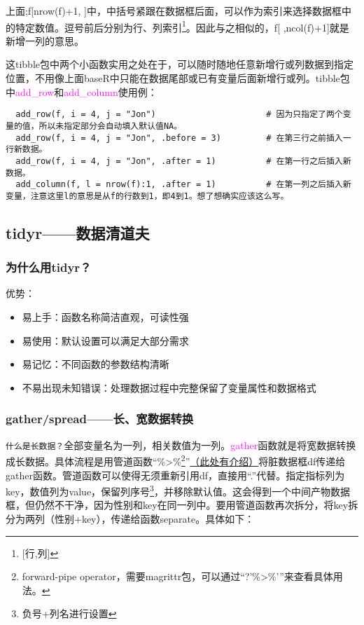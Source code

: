 \documentclass[cn,hazy,blue,14pt,screen]{elegantnote}
\begin{document}
上面;f[nrow(f)+1, ]中，中括号紧跟在数据框后面，可以作为索引来选择数据框中的特定数值。逗号前后分别为行、列索引\footnote{[行,列]}。因此与之相似的，f[ ,ncol(f)+1]就是新增一列的意思。

这tibble包中两个小函数实用之处在于，可以随时随地任意新增行或列数据到指定位置，不用像上面baseR中只能在数据尾部或已有变量后面新增行或列。tibble包中\textcolor{magenta}{add\_row}和\textcolor{magenta}{add\_column}使用例：

\begin{lstlisting}
  add_row(f, i = 4, j = "Jon")                      # 因为只指定了两个变量的值，所以未指定部分会自动填入默认值NA。
  add_row(f, i = 4, j = "Jon", .before = 3)         # 在第三行之前插入一行新数据。
  add_row(f, i = 4, j = "Jon", .after = 1)          # 在第一行之后插入新数据。
  add_column(f, l = nrow(f):1, .after = 1)          # 在第一列之后插入新变量，注意这里l的意思是从f的行数到1，即4到1。想了想确实应该这么写。
\end{lstlisting}

\subsection{tidyr——数据清道夫}

\subsubsection{为什么用tidyr？}

优势：

\begin{itemize}
  \item 易上手：函数名称简洁直观，可读性强
  \item 易使用：默认设置可以满足大部分需求
  \item 易记忆：不同函数的参数结构清晰
  \item 不易出现未知错误：处理数据过程中完整保留了变量属性和数据格式
\end{itemize}

\subsubsection{gather/spread——长、宽数据转换}

\lstinline{什么是长数据？}全部变量名为一列，相关数值为一列。\textcolor{magenta}{gather}函数就是将宽数据转换成长数据。具体流程是用管道函数“\%>\%\footnote{forward-pipe operator，需要magrittr包，可以通过“?'\%>\%'”来查看具体用法。}”\href{https://www.jianshu.com/p/c65dbce983dd}{（此处有介绍）}将脏数据框df传递给gather函数。管道函数可以使得无须重新引用df，直接用“.”代替。指定指标列为key，数值列为value，保留列序号\footnote{负号+列名进行设置}，并移除默认值。这会得到一个中间产物数据框，但仍然不干净，因为性别和key在同一列中。要用管道函数再次拆分，将key拆分为两列（性别+key），传递给函数separate。具体如下：
\end{document}

